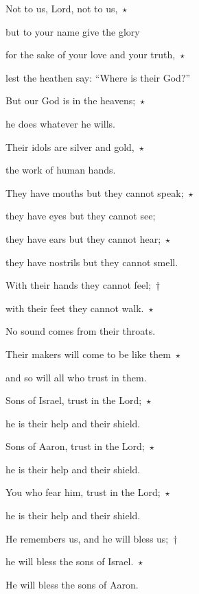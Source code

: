 \noindent Not to us, Lord, not to us,~$\star$~\nopagebreak

but to your name give the glory

\noindent for the sake of your love and your truth,~$\star$~\nopagebreak

lest the heathen say: “Where is their God?”



\noindent But our God is in the heavens;~$\star$~\nopagebreak

he does whatever he wills.

\noindent Their idols are silver and gold,~$\star$~\nopagebreak

the work of human hands.



\noindent They have mouths but they cannot speak;~$\star$~\nopagebreak

they have eyes but they cannot see;

\noindent they have ears but they cannot hear;~$\star$~\nopagebreak

they have nostrils but they cannot smell.



\noindent With their hands they cannot feel;~†~\nopagebreak

with their feet they cannot walk.~$\star$~\nopagebreak

No sound comes from their throats.



\noindent Their makers will come to be like them~$\star$~\nopagebreak

and so will all who trust in them.



\noindent Sons of Israel, trust in the Lord;~$\star$~\nopagebreak

he is their help and their shield.

\noindent Sons of Aaron, trust in the Lord;~$\star$~\nopagebreak

he is their help and their shield.



\noindent You who fear him, trust in the Lord;~$\star$~\nopagebreak

he is their help and their shield.

\noindent He remembers us, and he will bless us;~†~\nopagebreak

he will bless the sons of Israel.~$\star$~\nopagebreak

He will bless the sons of Aaron.




